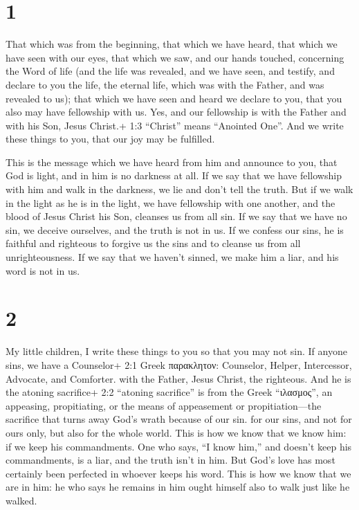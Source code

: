 \hypertarget{section}{%
\section{1}\label{section}}

 That which was from the beginning, that which we have
heard, that which we have seen with our eyes, that which we saw, and our
hands touched, concerning the Word of life  (and the life
was revealed, and we have seen, and testify, and declare to you the
life, the eternal life, which was with the Father, and was revealed to
us);  that which we have seen and heard we declare to you,
that you also may have fellowship with us. Yes, and our fellowship is
with the Father and with his Son, Jesus Christ.+ 1:3 ``Christ'' means
``Anointed One''.  And we write these things to you, that
our joy may be fulfilled.

 This is the message which we have heard from him and
announce to you, that God is light, and in him is no darkness at all.
 If we say that we have fellowship with him and walk in the
darkness, we lie and don't tell the truth.  But if we walk
in the light as he is in the light, we have fellowship with one another,
and the blood of Jesus Christ his Son, cleanses us from all sin.
 If we say that we have no sin, we deceive ourselves, and
the truth is not in us.  If we confess our sins, he is
faithful and righteous to forgive us the sins and to cleanse us from all
unrighteousness.  If we say that we haven't sinned, we make
him a liar, and his word is not in us.

\hypertarget{section-1}{%
\section{2}\label{section-1}}

 My little children, I write these things to you so that you
may not sin. If anyone sins, we have a Counselor+ 2:1 Greek παρακλητον:
Counselor, Helper, Intercessor, Advocate, and Comforter. with the
Father, Jesus Christ, the righteous.  And he is the atoning
sacrifice+ 2:2 ``atoning sacrifice'' is from the Greek ``ιλασμος'', an
appeasing, propitiating, or the means of appeasement or
propitiation---the sacrifice that turns away God's wrath because of our
sin. for our sins, and not for ours only, but also for the whole world.
 This is how we know that we know him: if we keep his
commandments.  One who says, ``I know him,'' and doesn't
keep his commandments, is a liar, and the truth isn't in him.
 But God's love has most certainly been perfected in whoever
keeps his word. This is how we know that we are in him:  he
who says he remains in him ought himself also to walk just like he
walked.

